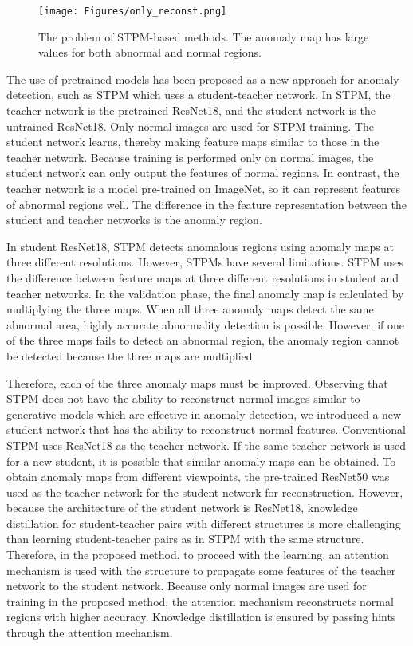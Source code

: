 \documentclass[letterpaper, 10 pt, conference]{ieeeconf}
\begin{document}
\begin{figure}[t]
\begin{center}

\texttt{[image: Figures/only\_reconst.png]}
\end{center}
\caption{The problem of STPM-based methods. The anomaly map has large values for both abnormal and normal regions.}
\label{f2}
\end{figure}

The use of pretrained models has been proposed as a new approach for anomaly detection, such as STPM\cite{c14} which uses a student-teacher network. In STPM, the teacher network is the pretrained ResNet18, and the student network is the untrained ResNet18. Only normal images are used for STPM training. The student network learns, thereby making feature maps similar to those in the teacher network. Because training is performed only on normal images, the student network can only output the features of normal regions. In contrast, the teacher network is a model pre-trained on ImageNet, so it can represent features of abnormal regions well. The difference in the feature representation between the student and teacher networks is the anomaly region. 


In student ResNet18, STPM detects anomalous regions using anomaly maps at three different resolutions. However, STPMs have several limitations. STPM uses the difference between feature maps at three different resolutions in student and teacher networks. In the validation phase, the final anomaly map is calculated by multiplying the three maps. When all three anomaly maps detect the same abnormal area, highly accurate abnormality detection is possible. However, if one of the three maps fails to detect an abnormal region, the anomaly region cannot be detected because the three maps are multiplied.

 
Therefore, each of the three anomaly maps must be improved. Observing that STPM does not have the ability to reconstruct normal images similar to generative models which are effective in anomaly detection, we introduced a new student network that has the ability to reconstruct normal features. Conventional STPM uses ResNet18 as the teacher network. If the same teacher network is used for a new student, it is possible that similar anomaly maps can be obtained. To obtain anomaly maps from different viewpoints, the pre-trained ResNet50 was used as the teacher network for the student network for reconstruction. However, because the architecture of the student network is ResNet18, knowledge distillation for student-teacher pairs with different structures is more challenging than learning student-teacher pairs as in STPM with the same structure. Therefore, in the proposed method, to proceed with the learning, an attention mechanism is used with the structure to propagate some features of the teacher network to the student network. Because only normal images are used for training in the proposed method, the attention mechanism reconstructs normal regions with higher accuracy. Knowledge distillation is ensured by passing hints through the attention mechanism.
\end{document}
